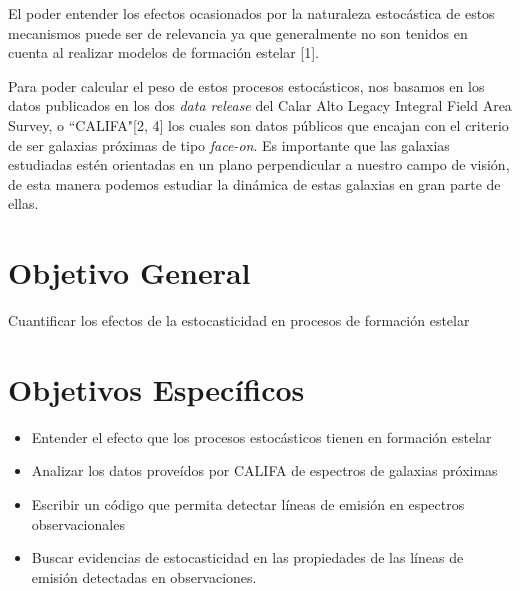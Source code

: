 \documentclass[12pt]{article}
\begin{document}



El poder entender los efectos ocasionados por la naturaleza estoc\'astica de estos mecanismos puede ser de relevancia ya que generalmente no son tenidos en cuenta al realizar modelos de formaci\'on estelar [1]. 

Para poder calcular el peso de estos procesos estoc\'asticos, nos basamos en los datos publicados en los dos \textit{data release} del Calar Alto Legacy Integral Field Area Survey, o ``CALIFA"[2, 4] los cuales son datos p\'ublicos que encajan con el criterio de ser galaxias pr\'oximas de tipo \textit{face-on}. Es importante que las galaxias estudiadas est\'en orientadas en un plano perpendicular a nuestro campo de visi\'on, de esta manera podemos estudiar la din\'amica de estas galaxias en gran parte de ellas.\\


\section{Objetivo General}

Cuantificar los efectos de la estocasticidad en procesos de formaci\'on estelar




\section{Objetivos Espec\'ificos}


\begin{itemize}
	\item Entender el efecto que los procesos estoc\'asticos tienen en formaci\'on estelar
	\item Analizar los datos prove\'idos por CALIFA de espectros de galaxias pr\'oximas
	\item Escribir un c\'odigo que permita detectar l\'ineas de emisi\'on en espectros observacionales
	\item Buscar evidencias de estocasticidad en las propiedades
          de las l\'ineas de emisi\'on detectadas en observaciones.
	
\end{itemize}
\end{document}
